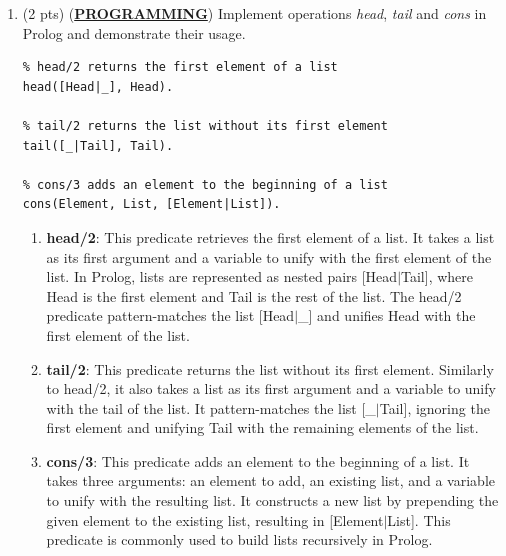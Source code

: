 \documentclass[12pt]{article}
\begin{document}
\begin{spacing}{1.5}
\begin{enumerate}
\begin{lstlisting}
; Test enqueue and dequeue operations
(enqueue 1) ; Enqueue element 1
(enqueue 2) ; Enqueue element 2
(enqueue 3) ; Enqueue element 3

(format t "Dequeued element: ~a~%" (dequeue)) ; Dequeue and print 1
(format t "Dequeued element: ~a~%" (dequeue)) ; Dequeue and print 2
(enqueue 4) ; Enqueue element 4
(format t "Dequeued element: ~a~%" (dequeue)) ; Dequeue and print 3
		      \end{lstlisting}
		      		      		              
		\item (2 pts) (\textbf{\uline{PROGRAMMING}}) Implement operations \textit{head}, \textit{tail} and \textit{cons} in Prolog and demonstrate their usage.
		      		      		      
		      \begin{lstlisting}
% head/2 returns the first element of a list
head([Head|_], Head).

% tail/2 returns the list without its first element
tail([_|Tail], Tail).

% cons/3 adds an element to the beginning of a list
cons(Element, List, [Element|List]).
		      \end{lstlisting}
		      		      
		      \begin{enumerate}
		      	\item \textbf{head/2}: This predicate retrieves the first element of a list. It takes a list as its first argument and a variable to unify with the first element of the list. In Prolog, lists are represented as nested pairs [Head$|$Tail], where Head is the first element and Tail is the rest of the list. The head/2 predicate pattern-matches the list [Head$|$\_] and unifies Head with the first element of the list.
		      	      		      	      
		      	\item \textbf{tail/2}: This predicate returns the list without its first element. Similarly to head/2, it also takes a list as its first argument and a variable to unify with the tail of the list. It pattern-matches the list [\_$|$Tail], ignoring the first element and unifying Tail with the remaining elements of the list.
		      	      		      	      
		      	\item \textbf{cons/3}: This predicate adds an element to the beginning of a list. It takes three arguments: an element to add, an existing list, and a variable to unify with the resulting list. It constructs a new list by prepending the given element to the existing list, resulting in [Element$|$List]. This predicate is commonly used to build lists recursively in Prolog.
		      \end{enumerate}
		      		      

\end{enumerate}
\end{spacing}
\end{document}
